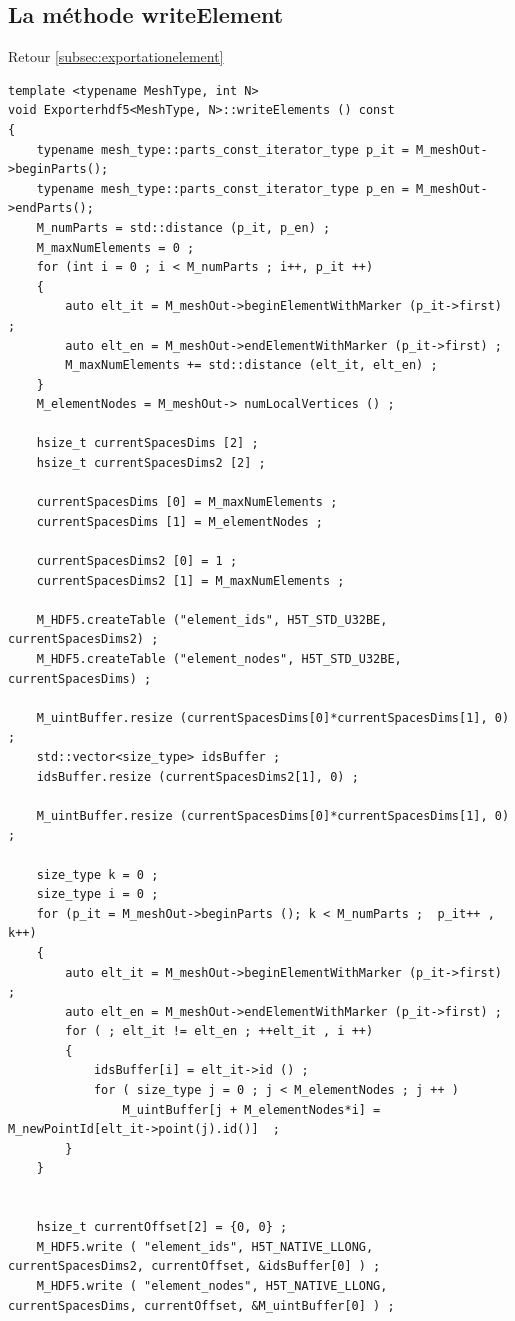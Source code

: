 \documentclass[12pt]{article}
\begin{document}
\subsection {La méthode writeElement}
\label{subsec:writeElement}
Retour \ref{subsec:exportationelement}
\begin{lstlisting}
template <typename MeshType, int N>
void Exporterhdf5<MeshType, N>::writeElements () const 
{
    typename mesh_type::parts_const_iterator_type p_it = M_meshOut->beginParts();
    typename mesh_type::parts_const_iterator_type p_en = M_meshOut->endParts();
    M_numParts = std::distance (p_it, p_en) ;
    M_maxNumElements = 0 ;
    for (int i = 0 ; i < M_numParts ; i++, p_it ++) 
    {
        auto elt_it = M_meshOut->beginElementWithMarker (p_it->first) ;
        auto elt_en = M_meshOut->endElementWithMarker (p_it->first) ;
        M_maxNumElements += std::distance (elt_it, elt_en) ;
    }
    M_elementNodes = M_meshOut-> numLocalVertices () ;

    hsize_t currentSpacesDims [2] ;
    hsize_t currentSpacesDims2 [2] ;

    currentSpacesDims [0] = M_maxNumElements ;
    currentSpacesDims [1] = M_elementNodes ;

    currentSpacesDims2 [0] = 1 ;
    currentSpacesDims2 [1] = M_maxNumElements ;

    M_HDF5.createTable ("element_ids", H5T_STD_U32BE, currentSpacesDims2) ;
    M_HDF5.createTable ("element_nodes", H5T_STD_U32BE, currentSpacesDims) ;

    M_uintBuffer.resize (currentSpacesDims[0]*currentSpacesDims[1], 0) ;
    std::vector<size_type> idsBuffer ;
    idsBuffer.resize (currentSpacesDims2[1], 0) ;

    M_uintBuffer.resize (currentSpacesDims[0]*currentSpacesDims[1], 0) ;

    size_type k = 0 ;
    size_type i = 0 ;
    for (p_it = M_meshOut->beginParts (); k < M_numParts ;  p_it++ , k++)
    {
        auto elt_it = M_meshOut->beginElementWithMarker (p_it->first) ;
        auto elt_en = M_meshOut->endElementWithMarker (p_it->first) ;
        for ( ; elt_it != elt_en ; ++elt_it , i ++)
        {
            idsBuffer[i] = elt_it->id () ;
            for ( size_type j = 0 ; j < M_elementNodes ; j ++ )
                M_uintBuffer[j + M_elementNodes*i] = M_newPointId[elt_it->point(j).id()]  ; 
        }
    }


    hsize_t currentOffset[2] = {0, 0} ;
    M_HDF5.write ( "element_ids", H5T_NATIVE_LLONG, currentSpacesDims2, currentOffset, &idsBuffer[0] ) ;
    M_HDF5.write ( "element_nodes", H5T_NATIVE_LLONG, currentSpacesDims, currentOffset, &M_uintBuffer[0] ) ;


\end{lstlisting}
\end{document}
